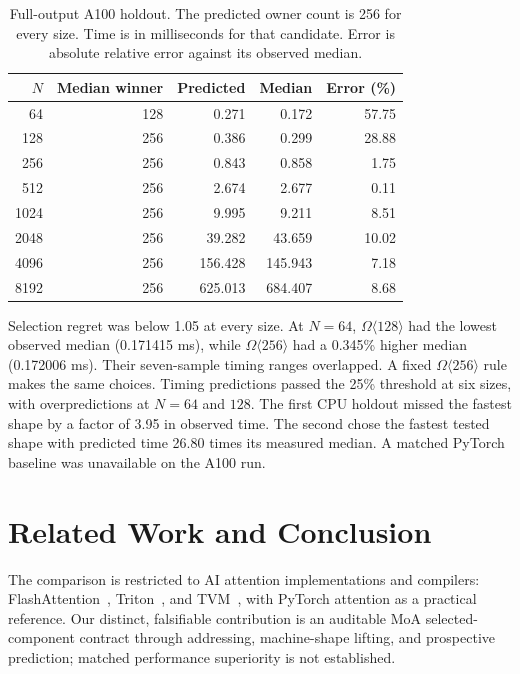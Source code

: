\documentclass[sigplan,10pt,review,balance=false,pbalance=false]{acmart}
\begin{document}
\begin{table}[t]
\centering\footnotesize
\caption{Full-output A100 holdout. The predicted owner count is 256 for every size. Time is in milliseconds for that candidate. Error is absolute relative error against its observed median.}\label{tab:full-a100}
\begin{tabular}{@{}rrrrr@{}}\toprule
$N$ & Median winner & Predicted & Median & Error (\%)\\\midrule
64 & 128 & 0.271 & 0.172 & 57.75 \\
128 & 256 & 0.386 & 0.299 & 28.88 \\
256 & 256 & 0.843 & 0.858 & 1.75 \\
512 & 256 & 2.674 & 2.677 & 0.11 \\
1024 & 256 & 9.995 & 9.211 & 8.51 \\
2048 & 256 & 39.282 & 43.659 & 10.02 \\
4096 & 256 & 156.428 & 145.943 & 7.18 \\
8192 & 256 & 625.013 & 684.407 & 8.68 \\
\bottomrule
\end{tabular}
\end{table}

Selection regret was below 1.05 at every size. At $N=64$, $\Omega\langle128\rangle$ had the lowest observed median (0.171415 ms), while $\Omega\langle256\rangle$ had a 0.345\% higher median (0.172006 ms). Their seven-sample timing ranges overlapped. A fixed $\Omega\langle256\rangle$ rule makes the same choices. Timing predictions passed the 25\% threshold at six sizes, with overpredictions at $N=64$ and $128$. The first CPU holdout missed the fastest shape by a factor of 3.95 in observed time. The second chose the fastest tested shape with predicted time 26.80 times its measured median. A matched PyTorch baseline was unavailable on the A100 run.

\section{Related Work and Conclusion}
The comparison is restricted to AI attention implementations and compilers: FlashAttention~\cite{flash,flash2}, Triton~\cite{triton}, and TVM~\cite{tvm}, with PyTorch attention as a practical reference. Our distinct, falsifiable contribution is an auditable MoA selected-component contract through addressing, machine-shape lifting, and prospective prediction; matched performance superiority is not established.
\end{document}
